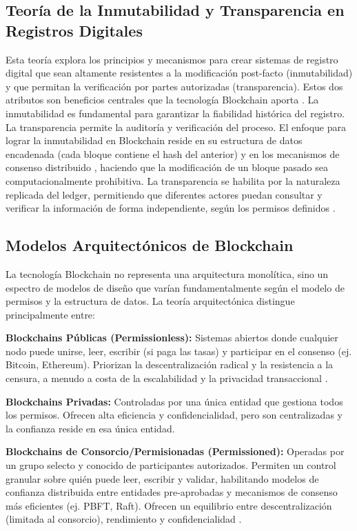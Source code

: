\subsection{Teoría de la Inmutabilidad y Transparencia en Registros Digitales} 
Esta teoría explora los principios y mecanismos para crear sistemas de registro digital que sean altamente resistentes a la modificación post-facto (inmutabilidad) y que permitan la verificación por partes autorizadas (transparencia). Estos dos atributos son beneficios centrales que la tecnología Blockchain aporta \parencite{swan2015blockchain,antonopoulos2023mastering}. La inmutabilidad es fundamental para garantizar la fiabilidad histórica del registro. La transparencia permite la auditoría y verificación del proceso. El enfoque para lograr la inmutabilidad en Blockchain reside en su estructura de datos encadenada (cada bloque contiene el hash del anterior) y en los mecanismos de consenso distribuido \parencite{nakamoto2008bitcoin}, haciendo que la modificación de un bloque pasado sea computacionalmente prohibitiva. La transparencia se habilita por la naturaleza replicada del ledger, permitiendo que diferentes actores puedan consultar y verificar la información de forma independiente, según los permisos definidos \parencite{antonopoulos2023mastering}. 

\subsection{ Modelos Arquitectónicos de Blockchain} 
La tecnología Blockchain no representa una arquitectura monolítica, sino un espectro de modelos de diseño que varían fundamentalmente según el modelo de permisos y la estructura de datos. La teoría arquitectónica distingue principalmente entre: 

\textbf{Blockchains Públicas (Permissionless):} Sistemas abiertos donde cualquier nodo puede unirse, leer, escribir (si paga las tasas) y participar en el consenso (ej. Bitcoin, Ethereum). Priorizan la descentralización radical y la resistencia a la censura, a menudo a costa de la escalabilidad y la privacidad transaccional \parencite{nakamoto2008bitcoin}. 

\textbf{Blockchains Privadas:} Controladas por una única entidad que gestiona todos los permisos. Ofrecen alta eficiencia y confidencialidad, pero son centralizadas y la confianza reside en esa única entidad. 

\textbf{Blockchains de Consorcio/Permisionadas (Permissioned):} Operadas por un grupo selecto y conocido de participantes autorizados. Permiten un control granular sobre quién puede leer, escribir y validar, habilitando modelos de confianza distribuida entre entidades pre-aprobadas y mecanismos de consenso más eficientes (ej. PBFT, Raft). Ofrecen un equilibrio entre descentralización (limitada al consorcio), rendimiento y confidencialidad \parencite{vukolic2015quest,cachin2018architecture}.

